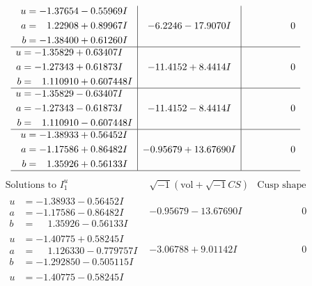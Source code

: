 \documentclass[1p]{elsarticle_modified}
\theoremstyle{definition}
\newcommand{\I}{\sqrt{-1}}
\begin{document}
$$\begin{array}{c|c|c}
\begin{aligned}
u &= -1.37654 - 0.55969 I \\
a &= \phantom{-}1.22908 + 0.89967 I \\
b &= -1.38400 + 0.61260 I\end{aligned}
 & -6.2246 - 17.9070 I & \phantom{-0.000000 } 0 \\ \hline\begin{aligned}
u &= -1.35829 + 0.63407 I \\
a &= -1.27343 + 0.61873 I \\
b &= \phantom{-}1.110910 + 0.607448 I\end{aligned}
 & -11.4152 + 8.4414 I & \phantom{-0.000000 } 0 \\ \hline\begin{aligned}
u &= -1.35829 - 0.63407 I \\
a &= -1.27343 - 0.61873 I \\
b &= \phantom{-}1.110910 - 0.607448 I\end{aligned}
 & -11.4152 - 8.4414 I & \phantom{-0.000000 } 0 \\ \hline\begin{aligned}
u &= -1.38933 + 0.56452 I \\
a &= -1.17586 + 0.86482 I \\
b &= \phantom{-}1.35926 + 0.56133 I\end{aligned}
 & -0.95679 + 13.67690 I & \phantom{-0.000000 } 0\\
 \hline 
 \end{array}$$\newpage$$\begin{array}{c|c|c}  
\text{Solutions to }I^u_{1}& \I (\text{vol} + \sqrt{-1}CS) & \text{Cusp shape}\\
 \hline 
\begin{aligned}
u &= -1.38933 - 0.56452 I \\
a &= -1.17586 - 0.86482 I \\
b &= \phantom{-}1.35926 - 0.56133 I\end{aligned}
 & -0.95679 - 13.67690 I & \phantom{-0.000000 } 0 \\ \hline\begin{aligned}
u &= -1.40775 + 0.58245 I \\
a &= \phantom{-}1.126330 - 0.779757 I \\
b &= -1.292850 - 0.505115 I\end{aligned}
 & -3.06788 + 9.01142 I & \phantom{-0.000000 } 0 \\ \hline\begin{aligned}
u &= -1.40775 - 0.58245 I \\

\end{aligned}
\end{array}$$
\end{document}
